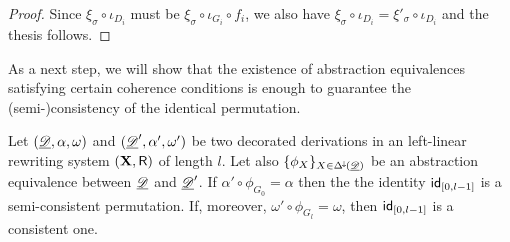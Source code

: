 \begin{proof}
	Since $\xi_\sigma \circ \iota_{D_i}$ must be $\xi_\sigma \circ \iota_{G_i}\circ f_i$, we also have
	$\xi_\sigma \circ \iota_{D_i}=\xi'_\sigma \circ \iota_{D_i}$
	and the thesis follows.
\end{proof}


As a next step, we will show that the existence of abstraction equivalences satisfying certain coherence conditions is enough to guarantee the (semi-)consistency of the identical permutation.

\begin{proposition}\label{rem:abscons}
	Let $(\underline{\mathscr{D}}, \alpha, \omega)$ and $(\underline{\mathscr{D}}', \alpha', \omega')$ be two decorated derivations in an left-linear rewriting system $(\textbf {\textup{X}}, \mathsf{R})$ of length $l$. Let also $\{\phi_X\}_{X\in \Delta^{\hspace{-1pt}\downarrow\hspace{-1pt}}(\underline{\mathscr{D}})}$ be an abstraction equivalence between $\underline{\mathscr{D}}$ and $\underline{\mathscr{D}}'$. If $\alpha'\circ \phi_{G_0}=\alpha$ then the the identity $\mathsf{id}_{[0,l-1]}$ is a semi-consistent permutation. If, moreover, $\omega'\circ \phi_{G_{l}}=\omega$, then $\mathsf{id}_{[0,l-1]}$ is a consistent one.
\end{proposition}
